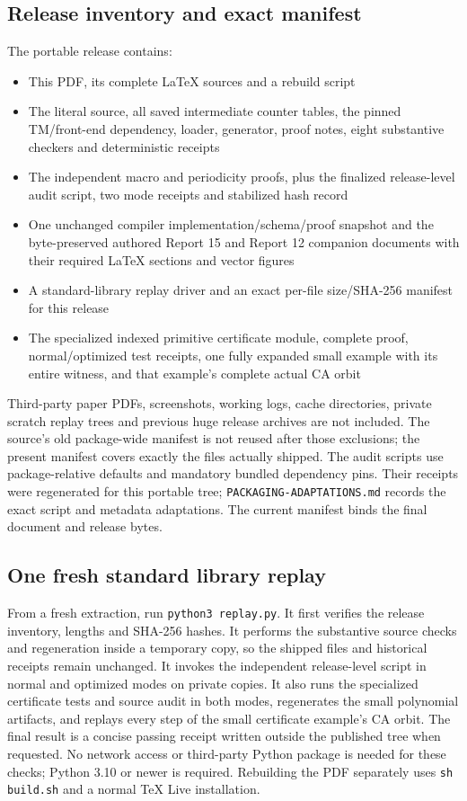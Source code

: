 \documentclass[11pt,a4paper]{article}
\numberwithin{equation}{section}
\newcommand{\code}[1]{\texttt{\small #1}}
\begin{document}
\subsection{Release inventory and exact manifest}
The portable release contains:
\begin{itemize}
\item This PDF, its complete LaTeX sources and a rebuild script
\item The literal source, all saved intermediate counter tables, the pinned
TM/front-end dependency, loader, generator, proof notes, eight substantive
checkers and deterministic receipts
\item The independent macro and periodicity proofs, plus the finalized
release-level audit script, two mode receipts and stabilized hash record
\item One unchanged compiler implementation/schema/proof snapshot and the
byte-preserved authored Report 15 and Report 12 companion documents with
their required LaTeX sections and vector figures
\item A standard-library replay driver and an exact per-file size/SHA-256
manifest for this release
\item The specialized indexed primitive certificate module, complete proof,
normal/optimized test receipts, one fully expanded small example with its
entire witness, and that example's complete actual CA orbit
\end{itemize}
Third-party paper PDFs, screenshots, working logs, cache directories, private
scratch replay trees and previous huge release archives are not included.
The source's old package-wide manifest is not reused after those exclusions;
the present manifest covers exactly the files actually shipped. The audit scripts use package-relative defaults and mandatory bundled
dependency pins. Their receipts were regenerated for this portable tree;
\code{PACKAGING-ADAPTATIONS.md} records the exact script and metadata
adaptations. The current manifest binds the final document and release bytes.

\subsection{One fresh standard library replay}
From a fresh extraction, run \code{python3 replay.py}. It first verifies
the release inventory, lengths and SHA-256 hashes. It performs the substantive
source checks and regeneration inside a temporary copy, so the shipped files
and historical receipts remain unchanged. It invokes the independent
release-level script in normal and optimized modes on private copies. It also runs the specialized certificate tests and source audit in
both modes, regenerates the small polynomial artifacts, and replays every
step of the small certificate example's CA orbit. The final result is a concise passing receipt written outside the
published tree when requested. No network access or third-party Python
package is needed for these checks; Python 3.10 or newer is required. Rebuilding the PDF separately
uses \code{sh build.sh} and a normal TeX Live installation.
\end{document}
